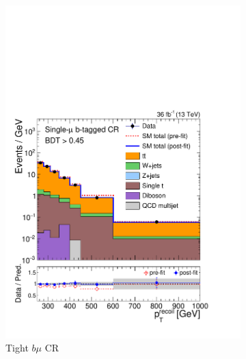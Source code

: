 \begin{figure}[]
\begin{center}
\begin{subfigure}[t]{0.24\textwidth}
            \includegraphics[width=\textwidth]{figures/monotop/postfit/stackedPostfit_singlemuontop_monotop.pdf}
            \caption{Tight $b\mu$ CR}
        \end{subfigure}
        \begin{subfigure}[t]{0.24\textwidth}

\end{subfigure}
\end{center}
\end{figure}
